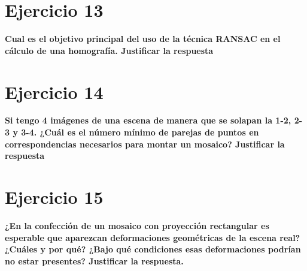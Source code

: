 \documentclass[11pt,a4paper]{article}
\begin{document}
\section*{Ejercicio 13}
\textbf{Cual es el objetivo principal del uso de la técnica RANSAC en el cálculo de una homografía. Justificar la respuesta}


\section*{Ejercicio 14}
\textbf{Si tengo 4 imágenes de una escena de manera que se solapan la 1-2, 2-3 y 3-4. ¿Cuál es el número mínimo de parejas de puntos en correspondencias
necesarios para montar un mosaico? Justificar la respuesta}


\section*{Ejercicio 15}
\textbf{¿En la confección de un mosaico con proyección rectangular es esperable que aparezcan deformaciones geométricas de la escena real? ¿Cuáles y por qué?
¿Bajo qué condiciones esas deformaciones podrían no estar presentes? Justificar la respuesta.}
\end{document}

